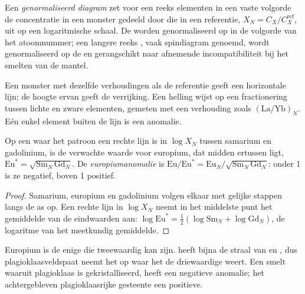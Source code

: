 \begin{definition}\label{def:b2:elements-in-the-earth:normalised}
Een \emph{genormaliseerd diagram} zet voor een reeks
elementen in een vaste volgorde de concentratie in een monster gedeeld door die in een
referentie, $X_N = C_X/C_X^{\mathrm{ref}}$, uit op een logaritmische schaal. De 
worden genormaliseerd op  in de volgorde van het atoomnummer; een langere reeks
, vaak spindiagram genoemd, wordt genormaliseerd op de
 en gerangschikt naar afnemende incompatibiliteit bij het smelten van de mantel.
\end{definition}

Een monster met dezelfde verhoudingen als de referentie geeft een horizontale lijn;
de hoogte ervan geeft de verrijking. Een helling wijst op een fractionering tussen lichte en
zware elementen, gemeten met een verhouding zoals $(\mathrm{La}/\mathrm{Yb})_N$. Eén
enkel element buiten de lijn is een anomalie.

\begin{proposition}[Europiumanomalie]\label{prop:b2:elements-in-the-earth:normalised}
Op een  waar het patroon een rechte lijn is in
$\log X_N$ tussen samarium en gadolinium, is de verwachte waarde voor europium, dat
midden ertussen ligt, $\mathrm{Eu}^* = \sqrt{\mathrm{Sm}_N\,\mathrm{Gd}_N}$. De
\emph{europiumanomalie} is
$\mathrm{Eu}/\mathrm{Eu}^* = \mathrm{Eu}_N/\sqrt{\mathrm{Sm}_N\,\mathrm{Gd}_N}$:
onder 1 is ze negatief, boven 1 positief.
\end{proposition}

\begin{proof}
Samarium, europium en gadolinium volgen elkaar met gelijke stappen langs de as op.
Een rechte lijn in $\log X_N$ neemt in het middelste punt het gemiddelde van de eindwaarden aan:
$\log \mathrm{Eu}^* = \tfrac12(\log \mathrm{Sm}_N + \log \mathrm{Gd}_N)$, de
logaritme van het meetkundig gemiddelde.
\end{proof}

Europium is de enige  die tweewaardig kan zijn.  heeft bijna de
straal van  en , dus plagioklaasveldspaat neemt het op waar het
de driewaardige  weert. Een smelt waaruit plagioklaas is gekristalliseerd,
heeft een negatieve anomalie; het achtergebleven plagioklaasrijke gesteente een positieve.

